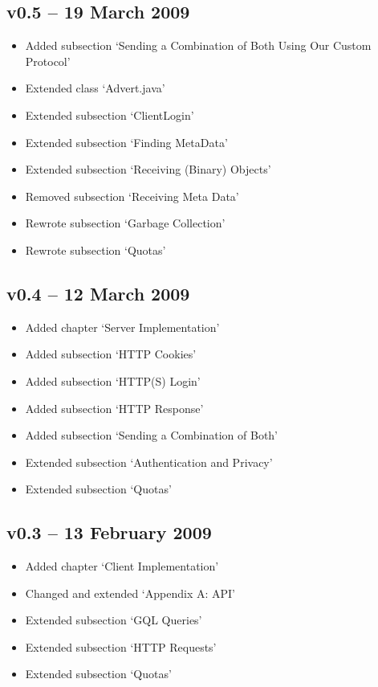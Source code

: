 \subsection*{v0.5 -- 19 March 2009}
\begin{itemize}
  \item Added subsection `Sending a Combination of Both Using Our Custom Protocol'
  \item Extended class `Advert.java'
  \item Extended subsection `ClientLogin'
  \item Extended subsection `Finding MetaData'
  \item Extended subsection `Receiving (Binary) Objects'
  \item Removed subsection `Receiving Meta Data'
  \item Rewrote subsection `Garbage Collection'
  \item Rewrote subsection `Quotas'
\end{itemize}

\subsection*{v0.4 -- 12 March 2009}
\begin{itemize}
  \item Added chapter `Server Implementation'
  \item Added subsection `HTTP Cookies'
  \item Added subsection `HTTP(S) Login'
  \item Added subsection `HTTP Response'
  \item Added subsection `Sending a Combination of Both'
  \item Extended subsection `Authentication and Privacy'
  \item Extended subsection `Quotas'
\end{itemize}

\subsection*{v0.3 -- 13 February 2009}
\begin{itemize}
  \item Added chapter `Client Implementation'
  \item Changed and extended `Appendix A: API'
  \item Extended subsection `GQL Queries'
  \item Extended subsection `HTTP Requests'
  \item Extended subsection `Quotas'
\end{itemize}

